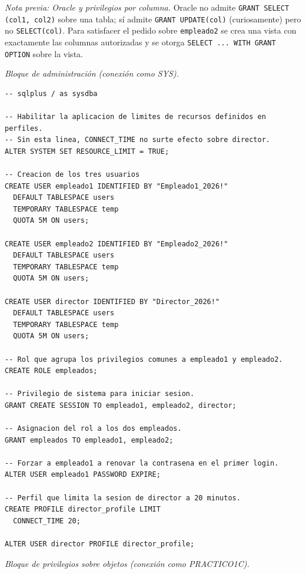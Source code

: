 \documentclass[11pt,a4paper]{article}
\begin{document}
\textit{Nota previa: Oracle y privilegios por columna.} Oracle no admite \texttt{GRANT SELECT (col1, col2)} sobre una tabla; sí admite \texttt{GRANT UPDATE(col)} (curiosamente) pero no \texttt{SELECT(col)}. Para satisfacer el pedido sobre \texttt{empleado2} se crea una vista con exactamente las columnas autorizadas y se otorga \texttt{SELECT ... WITH GRANT OPTION} sobre la vista.

\textit{Bloque de administración (conexión como SYS).}

\begin{lstlisting}
-- sqlplus / as sysdba

-- Habilitar la aplicacion de limites de recursos definidos en perfiles.
-- Sin esta linea, CONNECT_TIME no surte efecto sobre director.
ALTER SYSTEM SET RESOURCE_LIMIT = TRUE;

-- Creacion de los tres usuarios
CREATE USER empleado1 IDENTIFIED BY "Empleado1_2026!"
  DEFAULT TABLESPACE users
  TEMPORARY TABLESPACE temp
  QUOTA 5M ON users;

CREATE USER empleado2 IDENTIFIED BY "Empleado2_2026!"
  DEFAULT TABLESPACE users
  TEMPORARY TABLESPACE temp
  QUOTA 5M ON users;

CREATE USER director IDENTIFIED BY "Director_2026!"
  DEFAULT TABLESPACE users
  TEMPORARY TABLESPACE temp
  QUOTA 5M ON users;

-- Rol que agrupa los privilegios comunes a empleado1 y empleado2.
CREATE ROLE empleados;

-- Privilegio de sistema para iniciar sesion.
GRANT CREATE SESSION TO empleado1, empleado2, director;

-- Asignacion del rol a los dos empleados.
GRANT empleados TO empleado1, empleado2;

-- Forzar a empleado1 a renovar la contrasena en el primer login.
ALTER USER empleado1 PASSWORD EXPIRE;

-- Perfil que limita la sesion de director a 20 minutos.
CREATE PROFILE director_profile LIMIT
  CONNECT_TIME 20;

ALTER USER director PROFILE director_profile;
\end{lstlisting}

\textit{Bloque de privilegios sobre objetos (conexión como PRACTICO1C).}
\end{document}
